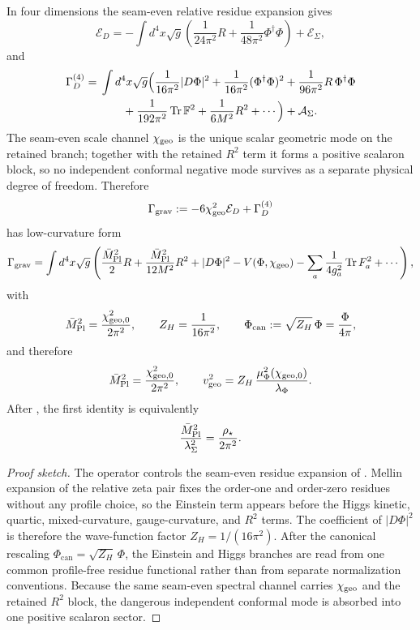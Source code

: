 \begin{theorem}
\label{prop:canonical-bosonic-normalization}
\label{thm:canonical-einstein-residue}
In four dimensions the seam-even relative residue expansion gives
\[
\mathcal E_D
=
-\int d^4x\sqrt g
\left(
\frac{1}{24\pi^2}R
+
\frac{1}{48\pi^2}\Phi^\dagger\Phi
\right)
+
\mathcal E_\Sigma,
\]
and
\[
\begin{aligned}
\Gamma_D^{(4)}
={}&
\int d^4x\sqrt g
\Big(
\frac{1}{16\pi^2}|D\Phi|^2
+\frac{1}{16\pi^2}(\Phi^\dagger\Phi)^2
+\frac{1}{96\pi^2}R\,\Phi^\dagger\Phi
\\
&\qquad
+\frac{1}{192\pi^2}\operatorname{Tr}\mathbb F^2
+\frac{1}{6M^2}R^2
+\cdots
\Big)
+\mathcal A_\Sigma.
\end{aligned}
\]
The seam-even scale channel $\chi_{\mathrm{geo}}$ is the unique scalar geometric mode on the retained branch;
together with the retained $R^2$ term it forms a positive scalaron block, so no independent
conformal negative mode survives as a separate physical degree of freedom.
Therefore
\[
\Gamma_{\mathrm{grav}}
:=
-6\chi_{\mathrm{geo}}^2\mathcal E_D+\Gamma_D^{(4)}
\]
has low-curvature form
\[
\Gamma_{\mathrm{grav}}
=
\int d^4x\sqrt g
\left(
\frac{\bar M_{\mathrm{Pl}}^2}{2}R
+
\frac{\bar M_{\mathrm{Pl}}^2}{12M^2}R^2
+
|D\Phi|^2
-V(\Phi,\chi_{\mathrm{geo}})
-\sum_a \frac{1}{4g_a^2}\operatorname{Tr} F_a^2
+\cdots
\right),
\]
with
\[
\bar M_{\mathrm{Pl}}^2=\frac{\chi_{\mathrm{geo},0}^2}{2\pi^2},
\qquad
Z_H=\frac{1}{16\pi^2},
\qquad
\Phi_{\mathrm{can}}:=\sqrt{Z_H}\,\Phi=\frac{\Phi}{4\pi},
\]
and therefore
\begin{equation}
\label{eq:induced-einstein}
\bar M_{\mathrm{Pl}}^2=\frac{\chi_{\mathrm{geo},0}^2}{2\pi^2},
\qquad
v_{\mathrm{geo}}^2=Z_H\,\frac{\mu_\Phi^2(\chi_{\mathrm{geo},0})}{\lambda_\Phi}.
\end{equation}
After , the first identity is equivalently
\[
\frac{\bar M_{\mathrm{Pl}}^2}{\lambda_\Sigma^2}=\frac{\rho_\star}{2\pi^2}.
\]
\end{theorem}

\begin{proof}[Proof sketch]
The operator  controls the seam-even residue expansion of
. Mellin expansion of the relative zeta pair fixes the order-one and
order-zero residues without any profile choice, so the Einstein term appears before the Higgs
kinetic, quartic, mixed-curvature, gauge-curvature, and $R^2$ terms. The coefficient of
$|D\Phi|^2$ is therefore the wave-function factor $Z_H=1/(16\pi^2)$. After the canonical rescaling
$\Phi_{\mathrm{can}}=\sqrt{Z_H}\,\Phi$, the Einstein and Higgs branches are read from one common
profile-free residue functional rather than from separate normalization conventions. Because the
same seam-even spectral channel carries $\chi_{\mathrm{geo}}$ and the retained $R^2$ block, the dangerous
independent conformal mode is absorbed into one positive scalaron sector.
\end{proof}

